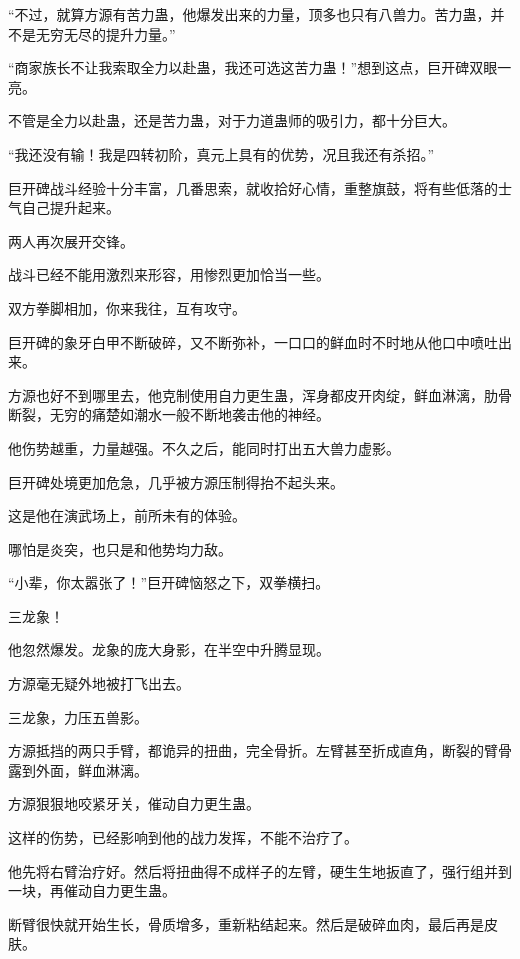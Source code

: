 
\begin{this_body}

“不过，就算方源有苦力蛊，他爆发出来的力量，顶多也只有八兽力。苦力蛊，并不是无穷无尽的提升力量。”

“商家族长不让我索取全力以赴蛊，我还可选这苦力蛊！”想到这点，巨开碑双眼一亮。

不管是全力以赴蛊，还是苦力蛊，对于力道蛊师的吸引力，都十分巨大。

“我还没有输！我是四转初阶，真元上具有的优势，况且我还有杀招。”

巨开碑战斗经验十分丰富，几番思索，就收拾好心情，重整旗鼓，将有些低落的士气自己提升起来。

两人再次展开交锋。

战斗已经不能用激烈来形容，用惨烈更加恰当一些。

双方拳脚相加，你来我往，互有攻守。

巨开碑的象牙白甲不断破碎，又不断弥补，一口口的鲜血时不时地从他口中喷吐出来。

方源也好不到哪里去，他克制使用自力更生蛊，浑身都皮开肉绽，鲜血淋漓，肋骨断裂，无穷的痛楚如潮水一般不断地袭击他的神经。

他伤势越重，力量越强。不久之后，能同时打出五大兽力虚影。

巨开碑处境更加危急，几乎被方源压制得抬不起头来。

这是他在演武场上，前所未有的体验。

哪怕是炎突，也只是和他势均力敌。

“小辈，你太嚣张了！”巨开碑恼怒之下，双拳横扫。

三龙象！

他忽然爆发。龙象的庞大身影，在半空中升腾显现。

方源毫无疑外地被打飞出去。

三龙象，力压五兽影。

方源抵挡的两只手臂，都诡异的扭曲，完全骨折。左臂甚至折成直角，断裂的臂骨露到外面，鲜血淋漓。

方源狠狠地咬紧牙关，催动自力更生蛊。

这样的伤势，已经影响到他的战力发挥，不能不治疗了。

他先将右臂治疗好。然后将扭曲得不成样子的左臂，硬生生地扳直了，强行组并到一块，再催动自力更生蛊。

断臂很快就开始生长，骨质增多，重新粘结起来。然后是破碎血肉，最后再是皮肤。


\end{this_body}
